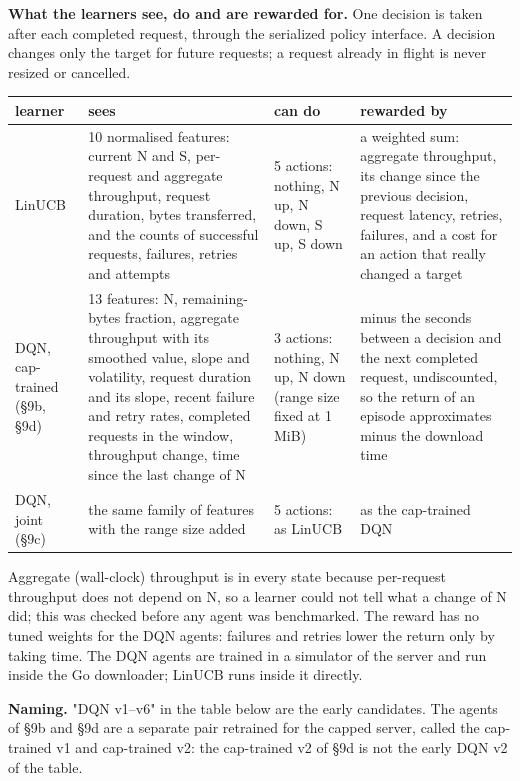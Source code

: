 \documentclass[conference]{IEEEtran}
\begin{document}
\textbf{What the learners see, do and are rewarded for.} One decision is taken after each completed request, through the serialized policy interface. A decision changes only the target for future requests; a request already in flight is never resized or cancelled.


\begin{table}[!t]\centering\footnotesize
\begin{tabularx}{\textwidth}{@{}LLLL@{}}
\toprule
\textbf{learner} & \textbf{sees} & \textbf{can do} & \textbf{rewarded by}\\
\midrule
LinUCB & 10 normalised features: current N and S, per-request and aggregate throughput, request duration, bytes transferred, and the counts of successful requests, failures, retries and attempts & 5 actions: nothing, N up, N down, S up, S down & a weighted sum: aggregate throughput, its change since the previous decision, request latency, retries, failures, and a cost for an action that really changed a target\\
DQN, cap-trained (§9b, §9d) & 13 features: N, remaining-bytes fraction, aggregate throughput with its smoothed value, slope and volatility, request duration and its slope, recent failure and retry rates, completed requests in the window, throughput change, time since the last change of N & 3 actions: nothing, N up, N down (range size fixed at 1 MiB) & minus the seconds between a decision and the next completed request, undiscounted, so the return of an episode approximates minus the download time\\
DQN, joint (§9c) & the same family of features with the range size added & 5 actions: as LinUCB & as the cap-trained DQN\\
\bottomrule
\end{tabularx}
\end{table}


Aggregate (wall-clock) throughput is in every state because per-request throughput does not depend on N, so a learner could not tell what a change of N did; this was checked before any agent was benchmarked. The reward has no tuned weights for the DQN agents: failures and retries lower the return only by taking time. The DQN agents are trained in a simulator of the server and run inside the Go downloader; LinUCB runs inside it directly.


\textbf{Naming.} "DQN v1–v6" in the table below are the early candidates. The agents of §9b and §9d are a separate pair retrained for the capped server, called the cap-trained v1 and cap-trained v2: the cap-trained v2 of §9d is not the early DQN v2 of the table.
\end{document}
